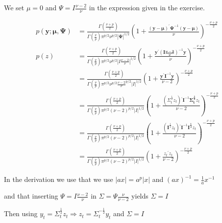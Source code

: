 \documentclass{article}
\begin{document}
We set $\mu=0$ and $\Psi=I\frac{\nu-2}{\nu}$ in the expression given in the exercise.

\begin{align*}
    p(\mathbf{y};\boldsymbol{\mu},\boldsymbol{\Psi})&=\frac{\Gamma\left(\frac{\nu+p}{2}\right)}{\Gamma\left(\frac{\nu}{p}\right)\pi^{p/2}\nu^{p/2}|\boldsymbol{\Psi}|^{1/2}}\left(1+\frac{(\mathbf{y}-\boldsymbol{\mu})^{\prime}\boldsymbol{\Psi}^{-1}(\mathbf{y}-\boldsymbol{\mu})}{\nu}\right)^{-\frac{\nu+p}{2}}\\
	p(z)&=\frac{\Gamma\left(\frac{\nu+p}{2}\right)}{\Gamma\left(\frac{\nu}{p}\right)\pi^{p/2}\nu^{p/2}|I\frac{\nu-2}{\nu}|^{1/2}}\left(1+\frac{\mathbf{y}{}^{\prime}\left(\boldsymbol{I\frac{\nu-2}{\nu}}\right)^{-1}\mathbf{y}}{\nu}\right)^{-\frac{\nu+p}{2}}\\
	&=\frac{\Gamma\left(\frac{\nu+p}{2}\right)}{\Gamma\left(\frac{\nu}{p}\right)\pi^{p/2}\nu^{p/2}\frac{\nu-2}{\nu}^{p/2}|I|^{1/2}}\left(1+\frac{\mathbf{y}{}^{\prime}\boldsymbol{I}^{-1}\mathbf{y}}{\nu-2}\right)^{-\frac{\nu+p}{2}}\\
	&=\frac{\Gamma\left(\frac{\nu+p}{2}\right)}{\Gamma\left(\frac{\nu}{p}\right)\pi^{p/2}\left(\nu-2\right)^{p/2}|I|^{1/2}}\left(1+\frac{\left(\Sigma_{t}^{\frac{1}{2}}z_{t}\right){}^{\prime}\boldsymbol{I}^{-1}\mathbf{\Sigma_{t}^{\frac{1}{2}}}z_{t}}{\nu-2}\right)^{-\frac{\nu+p}{2}}\\
	&=\frac{\Gamma\left(\frac{\nu+p}{2}\right)}{\Gamma\left(\frac{\nu}{p}\right)\pi^{p/2}\left(\nu-2\right)^{p/2}|I|^{1/2}}\left(1+\frac{\left(\boldsymbol{I}^{\frac{1}{2}}z_{t}\right){}^{\prime}\boldsymbol{I}^{-1}\mathbf{I^{\frac{1}{2}}}z_{t}}{\nu-2}\right)^{-\frac{\nu+p}{2}}\\
	&=\frac{\Gamma\left(\frac{\nu+p}{2}\right)}{\Gamma\left(\frac{\nu}{p}\right)\pi^{p/2}\left(\nu-2\right)^{p/2}|I|^{1/2}}\left(1+\frac{z_{t}{}^{\prime}z_{t}}{\nu-2}\right)^{-\frac{\nu+p}{2}}
\end{align*}

In the derivation we use that we use $\left|ax\right|=a^{p}\left|x\right|$ and $\left(ax\right)^{-1}=\frac{1}{a}x^{-1}$

and that inserting $\Psi=I\frac{\nu-2}{\nu}$ in $\Sigma=\Psi\frac{\nu}{\nu-2}$ yields $\Sigma=I$

Then using $y_{t}=\Sigma_{t}^{\frac{1}{2}}z_{t}\Rightarrow z_{t}=\Sigma_{t}^{-\frac{1}{2}}y_{t}$ and $\Sigma=I$
\end{document}
